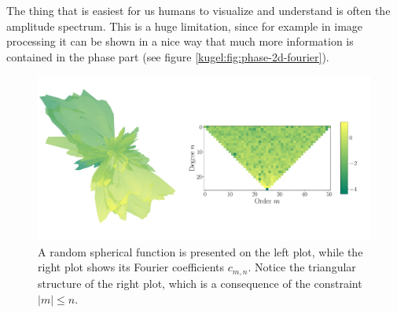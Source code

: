 The thing that is easiest for us humans to visualize and understand is often the
amplitude spectrum. This is a huge limitation, since for example in image
processing it can be shown in a nice way that much more information is contained
in the phase part (see figure \ref{kugel:fig:phase-2d-fourier}).

\begin{figure}
  \centering
  \includegraphics[width=.95\textwidth]{papers/kugel/figures/python/sph-fourier.pdf}
  \caption{
    A random spherical function is presented on the left plot, while the right
    plot shows its Fourier coefficients $c_{m,n}$. Notice the triangular
    structure of the right plot, which is a consequence of the constraint
    $|m|\leq n$.
    \label{kugel:fig:sph-fourier}
  }
\end{figure}

